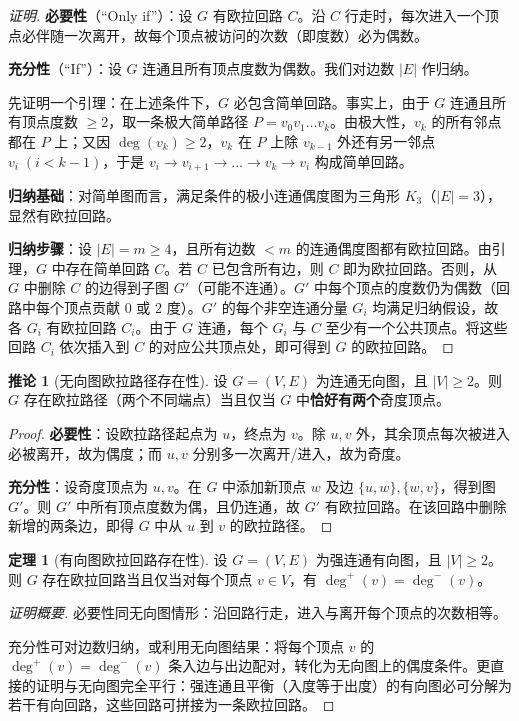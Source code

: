 \documentclass[UTF8,11pt,a4paper]{ctexbook}   %
\theoremstyle{definition}
\newtheorem{theorem}{定理}[section]
\newtheorem{corollary}{推论}[section]
\begin{document}
\begin{proof}[证明]
\textbf{必要性}（``Only if''）：设 $G$ 有欧拉回路 $C$。沿 $C$ 行走时，每次进入一个顶点必伴随一次离开，故每个顶点被访问的次数（即度数）必为偶数。

\textbf{充分性}（``If''）：设 $G$ 连通且所有顶点度数为偶数。我们对边数 $|E|$ 作归纳。

先证明一个引理：在上述条件下，$G$ 必包含简单回路。事实上，由于 $G$ 连通且所有顶点度数 $\ge 2$，取一条极大简单路径 $P=v_0v_1\dots v_k$。由极大性，$v_k$ 的所有邻点都在 $P$ 上；又因 $\deg(v_k)\ge 2$，$v_k$ 在 $P$ 上除 $v_{k-1}$ 外还有另一邻点 $v_i\;(i<k-1)$，于是 $v_i\to v_{i+1}\to\dots\to v_k\to v_i$ 构成简单回路。

\textbf{归纳基础}：对简单图而言，满足条件的极小连通偶度图为三角形 $K_3$（$|E|=3$），显然有欧拉回路。

\textbf{归纳步骤}：设 $|E|=m\ge 4$，且所有边数 $<m$ 的连通偶度图都有欧拉回路。由引理，$G$ 中存在简单回路 $C$。若 $C$ 已包含所有边，则 $C$ 即为欧拉回路。否则，从 $G$ 中删除 $C$ 的边得到子图 $G'$（可能不连通）。$G'$ 中每个顶点的度数仍为偶数（回路中每个顶点贡献 0 或 2 度）。$G'$ 的每个非空连通分量 $G_i$ 均满足归纳假设，故各 $G_i$ 有欧拉回路 $C_i$。由于 $G$ 连通，每个 $G_i$ 与 $C$ 至少有一个公共顶点。将这些回路 $C_i$ 依次插入到 $C$ 的对应公共顶点处，即可得到 $G$ 的欧拉回路。
\end{proof}

\begin{corollary}[无向图欧拉路径存在性]
设 $G=(V,E)$ 为连通无向图，且 $|V|\ge 2$。则 $G$ 存在欧拉路径（两个不同端点）当且仅当 $G$ 中\textbf{恰好有两个}奇度顶点。
\end{corollary}

\begin{proof}
\textbf{必要性}：设欧拉路径起点为 $u$，终点为 $v$。除 $u,v$ 外，其余顶点每次被进入必被离开，故为偶度；而 $u,v$ 分别多一次离开/进入，故为奇度。

\textbf{充分性}：设奇度顶点为 $u,v$。在 $G$ 中添加新顶点 $w$ 及边 $\{u,w\},\{w,v\}$，得到图 $G'$。则 $G'$ 中所有顶点度数为偶，且仍连通，故 $G'$ 有欧拉回路。在该回路中删除新增的两条边，即得 $G$ 中从 $u$ 到 $v$ 的欧拉路径。
\end{proof}

\begin{theorem}[有向图欧拉回路存在性]
设 $G=(V,E)$ 为强连通有向图，且 $|V|\ge 2$。则 $G$ 存在欧拉回路当且仅当对每个顶点 $v\in V$，有 $\deg^+(v)=\deg^-(v)$。
\end{theorem}

\begin{proof}[证明概要]
必要性同无向图情形：沿回路行走，进入与离开每个顶点的次数相等。

充分性可对边数归纳，或利用无向图结果：将每个顶点 $v$ 的 $\deg^+(v)=\deg^-(v)$ 条入边与出边配对，转化为无向图上的偶度条件。更直接的证明与无向图完全平行：强连通且平衡（入度等于出度）的有向图必可分解为若干有向回路，这些回路可拼接为一条欧拉回路。
\end{proof}
\end{document}
